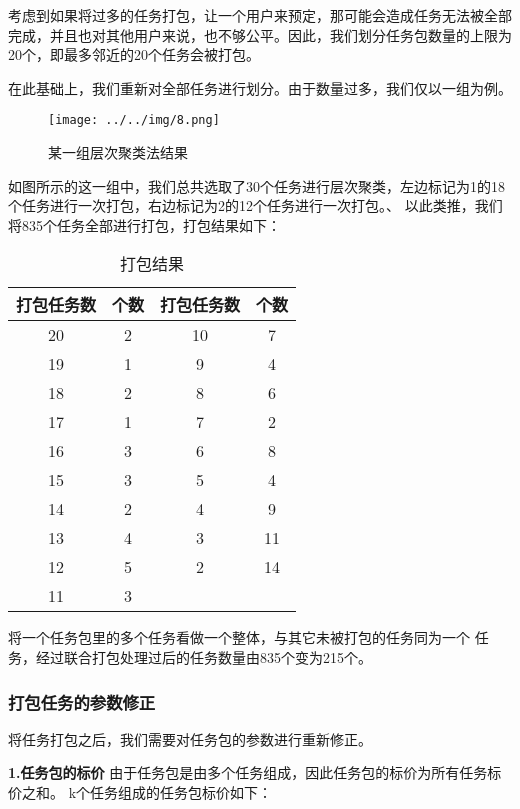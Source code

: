\documentclass[withoutpreface,bwprint]{cumcmthesis} %
\begin{document}
考虑到如果将过多的任务打包，让一个用户来预定，那可能会造成任务无法被全部完成，并且也对其他用户来说，也不够公平。因此，我们划分任务包数量的上限为20个，即最多邻近的20个任务会被打包。

在此基础上，我们重新对全部任务进行划分。由于数量过多，我们仅以一组为例。

\begin{figure}[H]
	\small
	\centering
	\texttt{[image: ../../img/8.png]}
	\caption{某一组层次聚类法结果} 
\end{figure}

如图所示的这一组中，我们总共选取了30个任务进行层次聚类，左边标记为1的18个任务进行一次打包，右边标记为2的12个任务进行一次打包。、
以此类推，我们将835个任务全部进行打包，打包结果如下：

\begin{table}[H]
	\centering
	\caption{打包结果}
\begin{tabular}{|c|c|c|c|}
	\hline
	打包任务数 & 个数 & 打包任务数 & 个数 \\ \hline
	20    & 2  & 10    & 7  \\ \hline
	19    & 1  & 9     & 4  \\ \hline
	18    & 2  & 8     & 6  \\ \hline
	17    & 1  & 7     & 2  \\ \hline
	16    & 3  & 6     & 8  \\ \hline
	15    & 3  & 5     & 4  \\ \hline
	14    & 2  & 4     & 9  \\ \hline
	13    & 4  & 3     & 11 \\ \hline
	12    & 5  & 2     & 14 \\ \hline
	11    & 3  &       &    \\ \hline
\end{tabular}
\end{table}
\vspace{-0.8cm}

将一个任务包里的多个任务看做一个整体，与其它未被打包的任务同为一个 任务，经过联合打包处理过后的任务数量由835个变为215个。

\subsubsection{打包任务的参数修正}

将任务打包之后，我们需要对任务包的参数进行重新修正。

\textbf{1.任务包的标价}
由于任务包是由多个任务组成，因此任务包的标价为所有任务标价之和。
k个任务组成的任务包标价如下：
\end{document}
